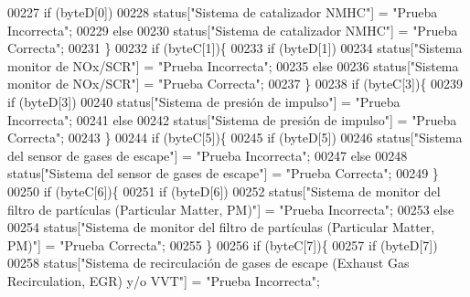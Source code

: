 \begin{DoxyCode}
00227             \textcolor{keywordflow}{if} (byteD[0])
00228                 status[\textcolor{stringliteral}{"Sistema de catalizador NMHC"}] = \textcolor{stringliteral}{"Prueba Incorrecta"};
00229             \textcolor{keywordflow}{else}
00230                 status[\textcolor{stringliteral}{"Sistema de catalizador NMHC"}] = \textcolor{stringliteral}{"Prueba Correcta"};
00231         \}
00232         \textcolor{keywordflow}{if} (byteC[1])\{
00233             \textcolor{keywordflow}{if} (byteD[1])
00234                 status[\textcolor{stringliteral}{"Sistema monitor de NOx/SCR"}] = \textcolor{stringliteral}{"Prueba Incorrecta"};
00235             \textcolor{keywordflow}{else}
00236                 status[\textcolor{stringliteral}{"Sistema monitor de NOx/SCR"}] = \textcolor{stringliteral}{"Prueba Correcta"};
00237         \}
00238         \textcolor{keywordflow}{if} (byteC[3])\{
00239             \textcolor{keywordflow}{if} (byteD[3])
00240                 status[\textcolor{stringliteral}{"Sistema de presión de impulso"}] = \textcolor{stringliteral}{"Prueba Incorrecta"};
00241             \textcolor{keywordflow}{else}
00242                 status[\textcolor{stringliteral}{"Sistema de presión de impulso"}] = \textcolor{stringliteral}{"Prueba Correcta"};
00243         \}
00244         \textcolor{keywordflow}{if} (byteC[5])\{
00245             \textcolor{keywordflow}{if} (byteD[5])
00246                 status[\textcolor{stringliteral}{"Sistema del sensor de gases de escape"}] = \textcolor{stringliteral}{"Prueba Incorrecta"};
00247             \textcolor{keywordflow}{else}
00248                 status[\textcolor{stringliteral}{"Sistema del sensor de gases de escape"}] = \textcolor{stringliteral}{"Prueba Correcta"};
00249         \}
00250         \textcolor{keywordflow}{if} (byteC[6])\{
00251             \textcolor{keywordflow}{if} (byteD[6])
00252                 status[\textcolor{stringliteral}{"Sistema de monitor del filtro de partículas (Particular Matter, PM)"}] = \textcolor{stringliteral}{"Prueba
       Incorrecta"};
00253             \textcolor{keywordflow}{else}
00254                 status[\textcolor{stringliteral}{"Sistema de monitor del filtro de partículas (Particular Matter, PM)"}] = \textcolor{stringliteral}{"Prueba
       Correcta"};
00255         \}
00256         \textcolor{keywordflow}{if} (byteC[7])\{
00257             \textcolor{keywordflow}{if} (byteD[7])
00258                 status[\textcolor{stringliteral}{"Sistema de recirculación de gases de escape (Exhaust Gas Recirculation, EGR) y/o
       VVT"}] = \textcolor{stringliteral}{"Prueba Incorrecta"};

\end{DoxyCode}
